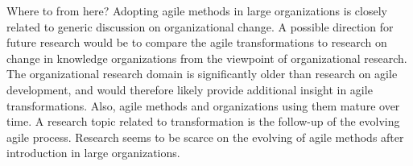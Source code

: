 Where to from here?
Adopting agile methods in large organizations is closely related to generic
discussion on organizational change. A possible direction for future research
would be to compare the agile transformations to research on change in knowledge
organizations from the viewpoint of organizational research. The organizational
research domain is significantly older than research on agile development, and
would therefore likely provide additional insight in agile transformations.
Also, agile methods and organizations using them mature over time. A research
topic related to transformation is the follow-up of the evolving agile process.
Research seems to be scarce on the evolving of agile methods after introduction
in large organizations.


% 
% 





